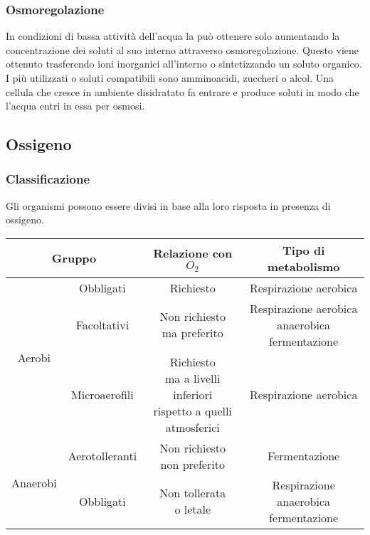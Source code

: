 		\subsubsection{Osmoregolazione}
		In condizioni di bassa attivit\`a dell'acqua la pu\`o ottenere solo aumentando la concentrazione dei soluti al suo interno attraverso osmoregolazione.
		Questo viene ottenuto trasferendo ioni inorganici all'interno o sintetizzando un soluto organico.
		I pi\`u utilizzati o soluti compatibili sono amminoacidi, zuccheri o alcol.
		Una cellula che cresce in ambiente disidratato fa entrare e produce soluti in modo che l'acqua entri in essa per osmosi.

	\subsection{Ossigeno}

		\subsubsection{Classificazione}
		Gli organismi possono essere divisi in base alla loro risposta in presenza di ossigeno.
		\begin{center}
			\begin{tabular}{|c|c|c|c|}
				\hline
				\multicolumn{2}{|c|}{Gruppo} & Relazione con \emph{$O_2$} & Tipo di metabolismo\\
				\hline
				\multirow{3}{*}{Aerobi} & Obbligati & Richiesto & Respirazione aerobica\\
				\cline{2-4}
							& Facoltativi & \makecell{Non richiesto\\ma preferito} & \makecell{Respirazione aerobica\\anaerobica\\fermentazione}\\
				\cline{2-4}
							& Microaerofili & \makecell{Richiesto\\ma a livelli inferiori\\rispetto a quelli \\atmosferici} & Respirazione aerobica\\
				\hline
				\multirow{2}{*}{Anaerobi} & Aerotolleranti & \makecell{Non richiesto\\non preferito} & Fermentazione\\
				\cline{2-4}
							  & Obbligati & \makecell{Non tollerata\\o letale} & \makecell{Respirazione anaerobica\\fermentazione}\\
				\hline
			\end{tabular}
		\end{center}

